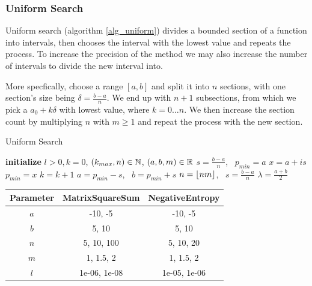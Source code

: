 \documentclass[a4paper,english,titlepage,12pt]{article}
\newcommand{\floor}[1]{\ensuremath\lfloor#1\rfloor}
\newcommand{\R}{\ensuremath\mathbb{R}}
\newcommand{\N}{\ensuremath\mathbb{N}}
\begin{document}
\subsubsection{Uniform Search}

Uniform search (algorithm \ref{alg_uniform}) divides a bounded section of a function into intervals, then chooses the interval with the lowest value and repeats the process. To increase the precision of the method we may also increase the number of intervals to divide the new interval into. \cite{book:nonlinear_programming}

More specfically, choose a range $[a, b]$ and split it into $n$ sections, with one section's size being $\delta = \frac{b - a}{n}$. We end up with $n + 1$ subsections, from which we pick a $a_0 + k \delta$ with lowest value, where $k = 0 \dots n$. We then increase the section count by multiplying $n$ with $m \geq 1$ and repeat the process with the new section.

\begin{algorithm}[H]
\caption{Uniform Search}
\label{alg_uniform}
\begin{algorithmic}[1]
\STATE \textbf{initialize} $l > 0, k = 0$, $(k_{max}, n) \in \N$, $(a, b, m) \in \R$
\STATE $s = \frac{b - a}{n}$, \ $p_{min} = a$
        \STATE $x = a + i s$
            \STATE $p_{min} = x$
        \ENDIF
        \STATE $k = k + 1$
    \ENDFOR
    \STATE $a = p_{min} - s$, \ $b = p_{min} + s$
    \STATE $n = \floor{n m}$, \ $s = \frac{b - a}{n}$
\ENDWHILE
\RETURN $\lambda = \frac{a + b}{2}$
\end{algorithmic}
\end{algorithm}

\begin{table}[H]
\label{tab:params_UniformSearch}
\centering
{}
\begin{tabular}{|c|c|c|}
\hline
\rowcolor{gray!25}
Parameter & MatrixSquareSum & NegativeEntropy \\
\hline
$a$ & -10, -5 & -10, -5 \\
$b$ & 5, 10 & 5, 10 \\
$n$ & 5, 10, 100 & 5, 10, 20 \\
$m$ & 1, 1.5, 2 & 1, 1.5, 2 \\
$l$ & 1e-06, 1e-08 & 1e-05, 1e-06 \\
\hline
\end{tabular}
\end{table}
\end{document}
